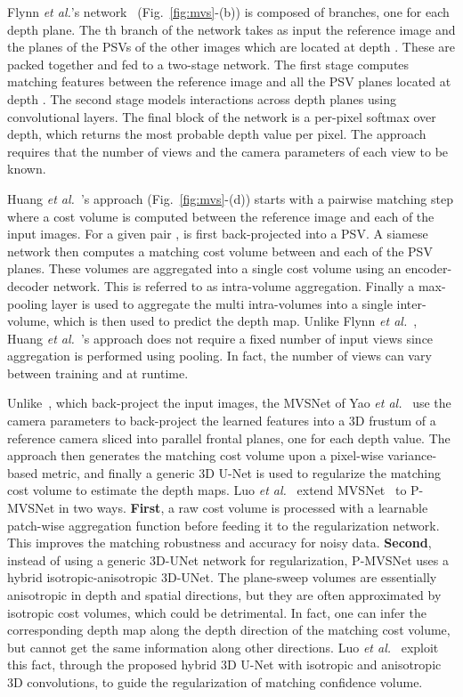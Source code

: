 \documentclass[10pt,journal,compsoc]{IEEEtran}
\newcommand{\etal}{\emph{et al.}}
\begin{document}
Flynn \etal's network~\cite{flynn2016deepstereo} (Fig.~\ref{fig:mvs}-(b)) is composed of  branches, one for each depth plane. The th  branch of the network takes as input the reference image and the planes of the PSVs of the other images  which are  located at  depth . These are packed together and fed to a two-stage network. The first stage computes  matching features between the reference image and all the PSV planes located at depth . The second stage models   interactions across depth planes using convolutional layers.   The final block of the network is a per-pixel softmax over depth, which returns the most probable depth value per pixel.  The approach  requires that the number of views and the camera parameters of each view to be known. 

Huang \etal~\cite{huang2018deepmvs}'s approach (Fig.~\ref{fig:mvs}-(d))  starts with a pairwise matching step where a cost volume is computed between the reference image and each of the input images. For a given pair ,   is first back-projected into a PSV. A siamese network then computes a matching cost volume between  and each of the PSV planes. These volumes are  aggregated into a single cost volume using an encoder-decoder network. This is referred to as intra-volume aggregation.  Finally a max-pooling layer is used to aggregate the multi intra-volumes into a single inter-volume, which is then used to predict the depth map. Unlike Flynn \etal~\cite{flynn2016deepstereo}, Huang \etal~\cite{huang2018deepmvs}'s approach does not require a fixed number of input views since  aggregation is performed using pooling.  In fact, the number of views can vary between training and at runtime. 

Unlike~\cite{flynn2016deepstereo,huang2018deepmvs}, which back-project the input images, the MVSNet of Yao \etal~\cite{yao2018mvsnet} use the camera parameters to back-project  the learned features into  a 3D frustum of a reference camera sliced into parallel frontal planes, one for   each depth value. The approach then generates the matching cost volume upon a pixel-wise variance-based metric, and finally a generic 3D U-Net is used to regularize the matching cost volume to estimate the depth maps. Luo \etal~\cite{Luo_2019_ICCV} extend MVSNet~\cite{yao2018mvsnet} to P-MVSNet in two ways. \textbf{First}, a raw cost volume is processed with a learnable patch-wise aggregation function before feeding it to the regularization network. This improves the matching robustness and accuracy for noisy data. \textbf{Second}, instead of using a generic 3D-UNet network for regularization, P-MVSNet uses a hybrid isotropic-anisotropic 3D-UNet. The plane-sweep volumes are essentially anisotropic in depth and spatial directions, but they are often approximated by isotropic cost volumes, which could be detrimental. In fact,  one can infer the corresponding depth map along the depth direction of the matching cost volume, but cannot get the same information along other directions.  Luo \etal~\cite{Luo_2019_ICCV} exploit  this fact, through the proposed  hybrid 3D U-Net with isotropic and anisotropic 3D convolutions,  to guide the regularization of matching confidence volume.
\end{document}
